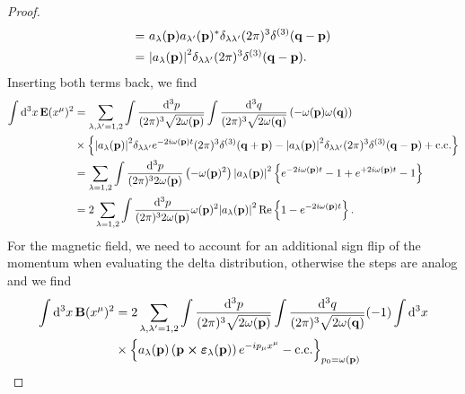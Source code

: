 \begin{proof}
\begin{equation*}
\begin{split}
			=&\
			a_\lambda(\vb{p})
			a_{\lambda^\prime}(\vb{p})^*
			\delta_{\lambda\lambda^\prime}
			(2\pi)^3\delta^{(3)}(\vb{q}-\vb{p})
			\\
			=&\
			\abs{a_\lambda(\vb{p})}^2
			\delta_{\lambda\lambda^\prime}
			(2\pi)^3\delta^{(3)}(\vb{q}-\vb{p})
			.
		\end{split}
	\end{equation*}
	Inserting both terms back, we find
	\begin{equation*}
		\begin{split}
			\int\dd[3]{x}
			\vb{E}(x^\mu)^2
			&=
			\sum_{\lambda,\lambda^\prime=1,2}
			\int\frac{\dd[3]{p}}{(2\pi)^3\sqrt{2\omega(\vb{p})}}
			\int\frac{\dd[3]{q}}{(2\pi)^3\sqrt{2\omega(\vb{q})}}
			\left(
				-
				\omega(\vb{p})
				\omega(\vb{q})
			\right)
			\\
			&\times
			\left\{
				\abs{a_\lambda(\vb{p})}^2
				\delta_{\lambda\lambda^\prime}
				e^{-2i\omega(\vb{p})t}
				(2\pi)^3\delta^{(3)}(\vb{q}+\vb{p})
				-
				\abs{a_\lambda(\vb{p})}^2
				\delta_{\lambda\lambda^\prime}
				(2\pi)^3\delta^{(3)}(\vb{q}-\vb{p})
				+
				\text{c.c.}
			\right\}
			\\
			&=
			\sum_{\lambda=1,2}
			\int\frac{\dd[3]{p}}{(2\pi)^32\omega(\vb{p})}
			\left(
				-
				\omega(\vb{p})^2
			\right)
			\abs{a_\lambda(\vb{p})}^2
			\left\{
				e^{-2i\omega(\vb{p})t}
				-
				1
				+
				e^{+2i\omega(\vb{p})t}
				-
				1
			\right\}
			\\
			&=
			2
			\sum_{\lambda=1,2}
			\int\frac{\dd[3]{p}}{(2\pi)^32\omega(\vb{p})}
			\omega(\vb{p})^2
			\abs{a_\lambda(\vb{p})}^2
			\operatorname{\operatorname{Re}}\left\{
				1
				-
				e^{-2i\omega(\vb{p})t}
			\right\}
			.
		\end{split}
	\end{equation*}
	For the magnetic field, we need to account for an additional sign flip of the momentum when evaluating the delta distribution, otherwise the steps are analog and we find
	\begin{equation*}
		\begin{split}
			\int\dd[3]{x}
			\vb{B}(x^\mu)^2
			&=
			2
			\sum_{\lambda,\lambda^\prime=1,2}
			\int\frac{\dd[3]{p}}{(2\pi)^3\sqrt{2\omega(\vb{p})}}
			\int\frac{\dd[3]{q}}{(2\pi)^3\sqrt{2\omega(\vb{q})}}
			(-1)
			\int\dd[3]{x}
			\\
			&\times
			\left\{
				a_\lambda(\vb{p})
				\left(
					\vb{p}
					\cp
					\boldsymbol{\varepsilon}_\lambda(\vb{p})
				\right)
				e^{-ip_\mu x^\mu}
				-
				\text{c.c.}
			\right\}_{p_0=\omega(\vb{p})}
			\\

\end{split}
\end{equation*}
\end{proof}
